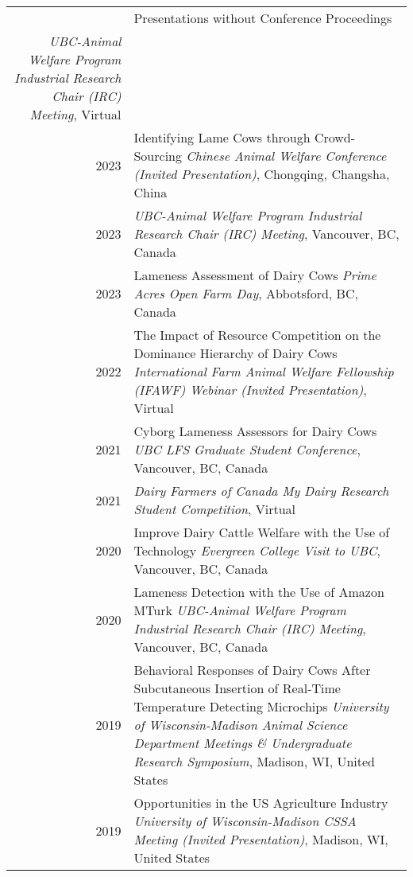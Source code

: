 \documentclass[letterpaper, 11pt]{article}
\newcommand{\headingfont}{\Large\color{OliveGreen}}
\newenvironment{SectionTable}[1]{
	\renewcommand*{\arraystretch}{1.7}
	\setlength{\tabcolsep}{10pt}
	\begin{longtable}{Rp{5.2in}} & #1 \\}
{\end{longtable}\vspace{-.3cm}}
\begin{document}
\begin{SectionTable}{\headingfont Presentations without Conference Proceedings}
\textit{UBC-Animal Welfare Program Industrial Research Chair (IRC) Meeting}, Virtual \\
2023 &
Identifying Lame Cows through Crowd-Sourcing \newline
\textit{Chinese Animal Welfare Conference (Invited Presentation)}, Chongqing, Changsha, China \\
2023 &
 \newline
\textit{UBC-Animal Welfare Program Industrial Research Chair (IRC) Meeting}, Vancouver, BC, Canada \\
2023 &
Lameness Assessment of Dairy Cows \newline
\textit{Prime Acres Open Farm Day}, Abbotsford, BC, Canada \\
2022 &
The Impact of Resource Competition on the Dominance Hierarchy of Dairy Cows \newline
\textit{International Farm Animal Welfare Fellowship (IFAWF) Webinar (Invited Presentation)}, Virtual \\
2021 &
Cyborg Lameness Assessors for Dairy Cows \newline
\textit{UBC LFS Graduate Student Conference}, Vancouver, BC, Canada \\
2021 &
 \newline
\textit{Dairy Farmers of Canada My Dairy Research Student Competition}, Virtual \\
2020 &
Improve Dairy Cattle Welfare with the Use of Technology \newline
\textit{Evergreen College Visit to UBC}, Vancouver, BC, Canada \\
2020 &
Lameness Detection with the Use of Amazon MTurk \newline
\textit{UBC-Animal Welfare Program Industrial Research Chair (IRC) Meeting}, Vancouver, BC, Canada \\
2019 &
Behavioral Responses of Dairy Cows After Subcutaneous Insertion of Real-Time Temperature Detecting Microchips \newline
\textit{University of Wisconsin-Madison Animal Science Department Meetings \& Undergraduate Research Symposium}, Madison, WI, United States \\
2019 &
Opportunities in the US Agriculture Industry \newline
\textit{University of Wisconsin-Madison CSSA Meeting (Invited Presentation)}, Madison, WI, United States \\
\end{SectionTable}
\end{document}
